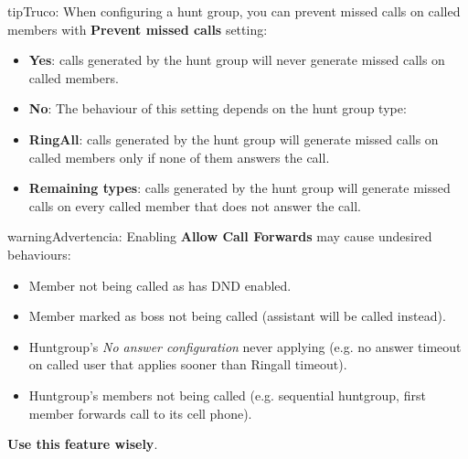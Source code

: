 \documentclass[letterpaper,10pt,spanish]{sphinxmanual}
\begin{document}
\begin{notice}{tip}{Truco:}
When configuring a hunt group, you can prevent missed calls on called members with \textbf{Prevent missed calls} setting:
\begin{itemize}
\item {} 
\textbf{Yes}: calls generated by the hunt group will never generate missed calls on called members.

\item {} 
\textbf{No}: The behaviour of this setting depends on the hunt group type:

\item {} 
\textbf{RingAll}: calls generated by the hunt group will generate missed calls on called members only if none of them answers the call.

\item {} 
\textbf{Remaining types}: calls generated by the hunt group will generate missed calls on every called member that does not answer the call.

\end{itemize}
\end{notice}

\begin{notice}{warning}{Advertencia:}
Enabling \textbf{Allow Call Forwards} may cause undesired behaviours:
\begin{itemize}
\item {} 
Member not being called as has DND enabled.

\item {} 
Member marked as boss not being called (assistant will be called instead).

\item {} 
Huntgroup's \emph{No answer configuration} never applying (e.g. no answer timeout on called user that applies sooner than Ringall timeout).

\item {} 
Huntgroup's members not being called (e.g. sequential huntgroup, first member forwards call to its cell phone).

\end{itemize}

\textbf{Use this feature wisely}.
\end{notice}
\end{document}
